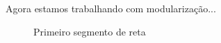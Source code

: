 Agora estamos trabalhando com modularização...

\begin{figure}[h]
	\caption[fig:reta]{Primeiro segmento de reta}
\end{figure}

